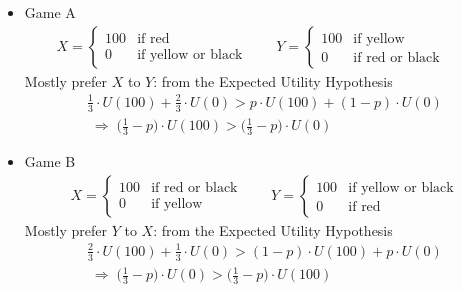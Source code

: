 \documentclass[10pt]{beamer}
\newcommand{\ie}{\;\Longrightarrow\;}
\begin{document}
\begin{frame}
  \begin{itemize}[<+->]\setlength\itemsep{0em}
    \item Game A  
      \begin{align*}
        X = \begin{cases}100 & \text{if red}\\0 & \text{if yellow or black}\end{cases} \qquad
        Y = \begin{cases}100 & \text{if yellow}\\0 & \text{if red or black}\end{cases} \qquad
      \end{align*}
      \onslide<+->
      Mostly prefer $X$ to $Y$: from the Expected Utility Hypothesis 
      \onslide<+->
      \begin{multline}
        \frac{1}{3}\cdot U(100) + \frac{2}{3}\cdot U(0) > p\cdot U(100) + (1 - p)\cdot U(0) \\ \ie\big(\frac{1}{3} - p\big)\cdot U(100) > \big(\frac{1}{3} - p\big)\cdot U(0)
      \end{multline}
    \item Game B 
      \begin{align*}
        X = \begin{cases}100 & \text{if red or black}\\ 0 & \text{if yellow}\end{cases} \qquad
        Y = \begin{cases}100 & \text{if yellow or black}\\ 0 & \text{if red}\end{cases}
      \end{align*}
      \onslide<+->
      Mostly prefer $Y$ to $X$: from the Expected Utility Hypothesis 
      \onslide<+->
      \begin{multline}
        \frac{2}{3}\cdot U(100) + \frac{1}{3}\cdot U(0) > (1 - p)\cdot U(100) + p\cdot U(0) \\ \ie\big(\frac{1}{3} - p\big)\cdot U(0) > \big(\frac{1}{3} - p\big)\cdot U(100)
      \end{multline}
  \end{itemize}
\end{frame}
\end{document}
